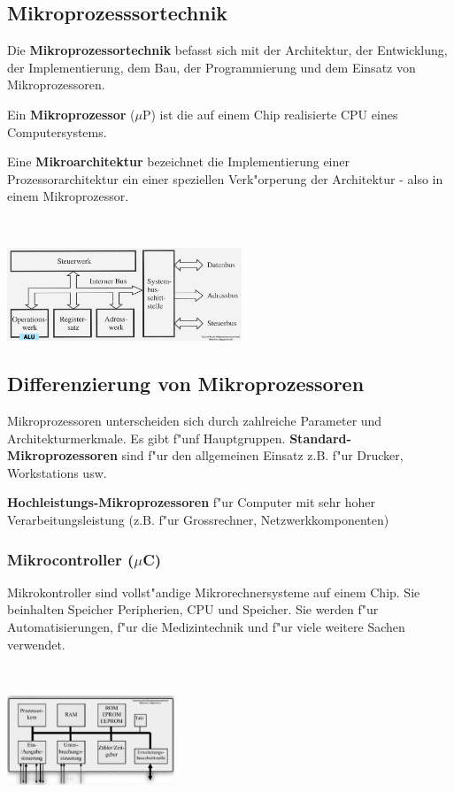 \subsection{Mikroprozesssortechnik}
\begin{minipage}{11cm}
	Die \textbf{Mikroprozessortechnik} befasst sich mit der Architektur, der Entwicklung, der Implementierung, dem Bau, der Programmierung und dem Einsatz von Mikroprozessoren.

Ein \textbf{Mikroprozessor} ($\mu$P) ist die auf einem Chip realisierte CPU eines Computersystems.

Eine \textbf{Mikroarchitektur} bezeichnet die Implementierung einer Prozessorarchitektur ein einer speziellen Verk"orperung der Architektur - also in einem Mikroprozessor.
\end{minipage}
%
\begin{minipage}{0.5cm}
	\ \
\end{minipage}
%
\begin{minipage}{7cm}
	\includegraphics[width=7cm]{pics/CPU}
\end{minipage}

\subsection{Differenzierung von Mikroprozessoren}
Mikroprozessoren unterscheiden sich durch zahlreiche Parameter und Architekturmerkmale. Es gibt f"unf Hauptgruppen.
\textbf{Standard-Mikroprozessoren} sind f"ur den allgemeinen Einsatz z.B. f"ur Drucker, Workstations usw.

\textbf{Hochleistungs-Mikroprozessoren} f"ur Computer mit sehr hoher Verarbeitungsleistung (z.B. f"ur Grossrechner, Netzwerkkomponenten)

\begin{minipage}{9cm}
\subsubsection{Mikrocontroller ($\mu$C)}
	Mikrokontroller sind vollst"andige Mikrorechnersysteme auf einem Chip. Sie beinhalten Speicher Peripherien, CPU und Speicher.
	Sie werden f"ur Automatisierungen, f"ur die Medizintechnik und f"ur viele weitere Sachen verwendet.\\
	\end{minipage}
%
\begin{minipage}{0.5cm}
	\ \
\end{minipage}
%
\begin{minipage}{9cm}
	\includegraphics[width=5cm]{pics/Mikrokontroller}
\end{minipage}

